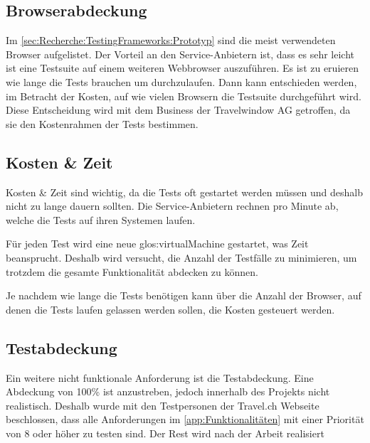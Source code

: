 \subsection{Browserabdeckung}
Im \cref{sec:Recherche:TestingFrameworks:Prototyp}  sind die meist verwendeten Browser aufgelistet. Der Vorteil an den Service-Anbietern ist, dass es sehr leicht ist eine Testsuite auf einem weiteren Webbrowser auszuführen. Es ist zu eruieren wie lange die Tests brauchen um durchzulaufen. Dann kann entschieden werden, im Betracht der Kosten, auf wie vielen Browsern die Testsuite durchgeführt wird. Diese Entscheidung wird mit dem Business der Travelwindow AG getroffen, da sie den Kostenrahmen der Tests bestimmen.

\subsection{Kosten \& Zeit}
Kosten \& Zeit sind wichtig, da die Tests oft gestartet werden müssen und deshalb nicht zu lange dauern sollten. Die Service-Anbietern rechnen pro Minute ab, welche die Tests auf ihren Systemen laufen. 

Für jeden Test wird eine neue \Gls{glos:virtualMachine} gestartet, was Zeit beansprucht. Deshalb wird versucht, die Anzahl der Testfälle zu minimieren, um trotzdem die gesamte Funktionalität abdecken zu können.

Je nachdem wie lange die Tests benötigen kann über die Anzahl der Browser, auf denen die Tests laufen gelassen werden sollen, die Kosten gesteuert werden.

\subsection{Testabdeckung}
Ein weitere nicht funktionale Anforderung ist die Testabdeckung. Eine Abdeckung von 100\% ist anzustreben, jedoch innerhalb des Projekts nicht realistisch. Deshalb wurde mit den Testpersonen der Travel.ch Webseite beschlossen, dass alle Anforderungen im \cref{app:Funktionalitäten}  mit einer Priorität von 8 oder höher zu testen sind. Der Rest wird nach der Arbeit realisiert